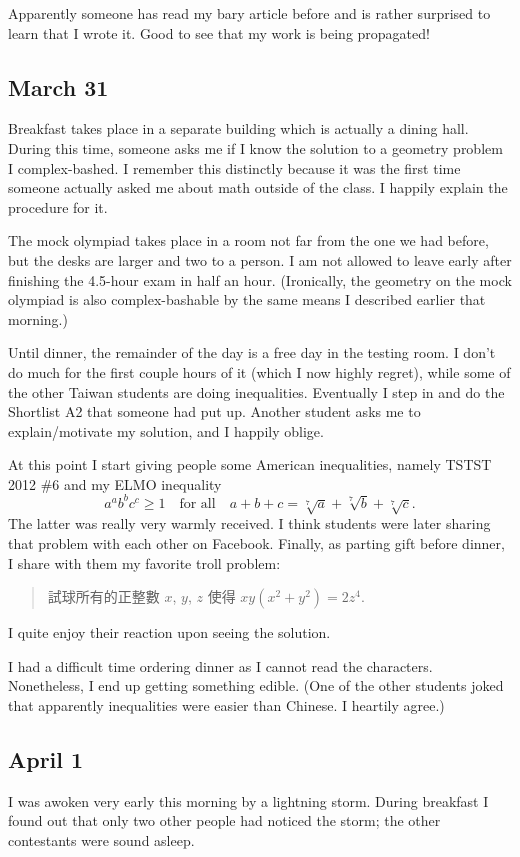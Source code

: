 \documentclass[11pt]{scrreprt}
\begin{document}
Apparently someone has read my bary article before and is rather surprised to learn that I wrote it.
Good to see that my work is being propagated!

\subsection{March 31}
Breakfast takes place in a separate building which is actually a dining hall.
During this time, someone asks me if I know the solution to a geometry problem I complex-bashed.
I remember this distinctly because it was the first time someone actually asked
me about math outside of the class. I happily explain the procedure for it.

The mock olympiad takes place in a room not far from the one we had before,
but the desks are larger and two to a person.
I am not allowed to leave early after finishing the 4.5-hour exam in half an hour.
(Ironically, the geometry on the mock olympiad is also complex-bashable by the
same means I described earlier that morning.)

Until dinner, the remainder of the day is a free day in the testing room.
I don't do much for the first couple hours of it (which I now highly regret),
while some of the other Taiwan students are doing inequalities.
Eventually I step in and do the Shortlist A2 that someone had put up.
Another student asks me to explain/motivate my solution, and I happily oblige.

At this point I start giving people some American inequalities, namely TSTST 2012 \#6 and my ELMO inequality
\[ a^a b^b c^c \ge 1 \quad \text{for all} \quad a+b+c = \sqrt[7]{a} + \sqrt[7]{b} + \sqrt[7]{c}. \]
The latter was really very warmly received.
I think students were later sharing that problem with each other on Facebook.
Finally, as parting gift before dinner, I share with them my favorite troll problem:
\begin{quote}
  試球所有的正整數 $x$, $y$, $z$ 使得 $xy(x^2+y^2)=2z^4$.
\end{quote}
I quite enjoy their reaction upon seeing the solution.

I had a difficult time ordering dinner as I cannot read the characters.
Nonetheless, I end up getting something edible.
(One of the other students joked that apparently inequalities were easier than Chinese. I heartily agree.)

\subsection{April 1}
I was awoken very early this morning by a lightning storm.
During breakfast I found out that only two other people had noticed the storm;
the other contestants were sound asleep.
\end{document}
